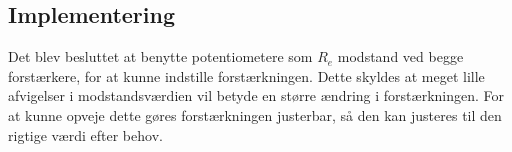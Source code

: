 \subsection{Implementering}
Det blev besluttet at benytte potentiometere som $R_e$ modstand ved begge forstærkere, for at kunne indstille forstærkningen. Dette skyldes at meget lille afvigelser i modstandsværdien vil betyde en større ændring i forstærkningen. For at kunne opveje dette gøres forstærkningen justerbar, så den kan justeres til den rigtige værdi efter behov.